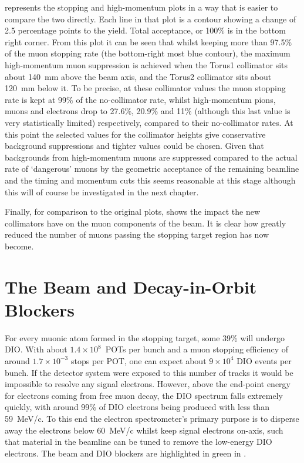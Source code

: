 \FigOptimMuBeamCollimMuonPathsWColl
{} represents the stopping and high-momentum plots in a way that is easier to compare the two directly.
Each line in that plot is a contour showing a change of 2.5 percentage points to the yield.  Total acceptance, or 100\% is in the bottom right corner.
From this plot it can be seen that whilst keeping more than 97.5\% of the muon stopping rate (the bottom-right most blue contour), the maximum high-momentum muon suppression is achieved when the Torus1 collimator sits about 140~mm above the beam axis, and the Torus2 collimator sits about 120~mm below it.
To be precise, at these collimator values  the muon stopping rate is kept at 99\% of the no-collimator rate, whilst high-momentum pions, muons and electrons drop to 27.6\%, 20.9\% and 11\% (although this last value is very statistically limited) respectively, compared to their no-collimator rates.
At this point the selected values for the collimator heights give conservative background suppressions and tighter values could be chosen.
Given that backgrounds from high-momentum muons are suppressed compared to the actual rate of `dangerous' muons by the geometric acceptance of the remaining beamline and the timing and momentum cuts this seems reasonable at this stage although this will of course be investigated in the next chapter.

Finally, for comparison to the original plots,  shows the impact the new collimators have on the muon components of the beam.
It is clear how greatly reduced the number of muons passing the stopping target region has now become.
\clearpage

\section{The Beam and Decay-in-Orbit Blockers}
\FigOptimDIOBeamBlockGeometry
\FigOptimDIOBeamBlockESTDispersion
For every muonic atom formed in the stopping target, some 39\% will undergo \acf{DIO}.
With about $1.4\times10^{8}$~\acp{POT} per bunch and a muon stopping efficiency of around $1.7\times10^{-3}$ stops per \ac{POT}, one can expect about $9\times10^{4}$ DIO events per bunch.
If the detector system were exposed to this number of tracks it would be impossible to resolve any signal electrons.
However, above the end-point energy for electrons coming from free muon decay, the DIO spectrum falls extremely quickly, with around 99\% of DIO electrons being produced with less than 59~MeV/c.
To this end the electron spectrometer's primary purpose is to disperse away the electrons below 60~MeV/c whilst keep signal electrons on-axis, such that material in the beamline can be tuned to remove the low-energy DIO electrons.
The beam and DIO blockers are highlighted in green in .

